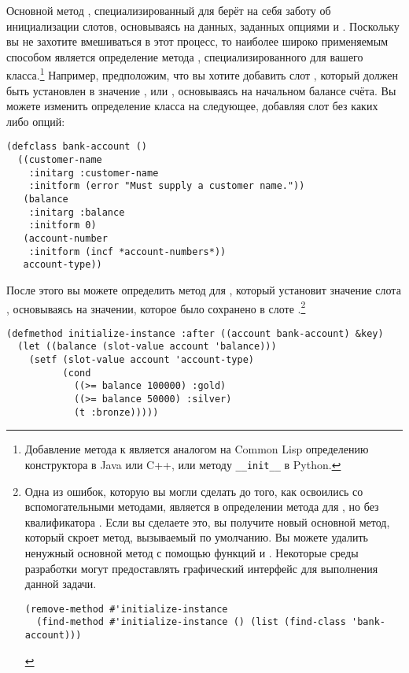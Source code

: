 Основной метод , специализированный для 
берёт на себя заботу об инициализации слотов, основываясь на данных, заданных опциями
 и .  Поскольку вы не захотите вмешиваться в этот процесс,
то наиболее широко применяемым способом является определение метода ,
специализированного для вашего класса.\footnote{Добавление метода  к
   является аналогом на Common Lisp определению конструктора в
  Java или C++, или методу \lstinline!__init__! в Python.}  Например, предположим, что вы
хотите добавить слот , который должен быть установлен в значение
,  или , основываясь на начальном балансе счёта.
Вы можете изменить определение класса на следующее, добавляя слот  без
каких либо опций:

\begin{lstlisting}
(defclass bank-account ()
  ((customer-name
    :initarg :customer-name
    :initform (error "Must supply a customer name."))
   (balance
    :initarg :balance
    :initform 0)
   (account-number
    :initform (incf *account-numbers*))
   account-type))
\end{lstlisting}

После этого вы можете определить метод  для ,
который установит значение слота , основываясь на значении, которое
было сохранено в слоте .\footnote{Одна из ошибок, которую вы могли сделать
  до того, как освоились со вспомогательными методами, является в определении метода для
  , но без квалификатора .  Если вы сделаете это,
  вы получите новый основной метод, который скроет метод, вызываемый по умолчанию.  Вы
  можете удалить ненужный основной метод с помощью функций  и
  .  Некоторые среды разработки могут предоставлять графический
  интерфейс для выполнения данной задачи.

\begin{lstlisting}
(remove-method #'initialize-instance
  (find-method #'initialize-instance () (list (find-class 'bank-account)))
\end{lstlisting}
}

\begin{lstlisting}
(defmethod initialize-instance :after ((account bank-account) &key)
  (let ((balance (slot-value account 'balance)))
    (setf (slot-value account 'account-type)
          (cond
            ((>= balance 100000) :gold)
            ((>= balance 50000) :silver)
            (t :bronze)))))
\end{lstlisting}

